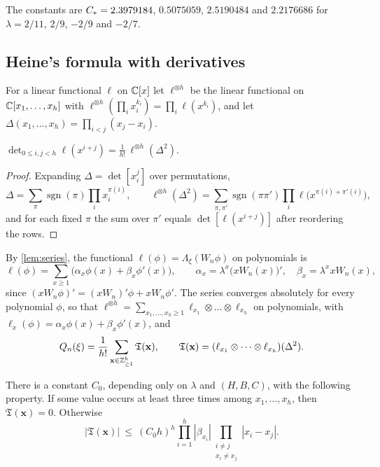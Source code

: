The constants are $C_{*}=2.3979184$, $0.5075059$, $2.5190484$ and $2.2176686$ for $\lambda=2/11$, $2/9$, $-2/9$ and $-2/7$.

\subsection{Heine's formula with derivatives}\label{sec:heine}
For a linear functional $\ell$ on $\mathbb{C}[x]$ let $\ell^{\otimes h}$ be the linear functional on $\mathbb{C}[x_1,\dots,x_h]$ with $\ell^{\otimes h}(\prod_ix_i^{k_i})=\prod_i\ell(x^{k_i})$, and let $\Delta(x_1,\dots,x_h)=\prod_{i<j}(x_j-x_i)$.

\begin{lemma}[Heine]\label{lem:heine}
$\det_{0\le i,j<h}\ell(x^{i+j})=\frac1{h!}\,\ell^{\otimes h}(\Delta^2)$.
\end{lemma}

\begin{proof}
Expanding $\Delta=\det[x_i^{j}]$ over permutations,
\[
\Delta=\sum_\pi\operatorname{sgn}(\pi)\prod_ix_i^{\pi(i)},\qquad \ell^{\otimes h}(\Delta^2)=\sum_{\pi,\pi'}\operatorname{sgn}(\pi\pi')\prod_i\ell\bigl(x^{\pi(i)+\pi'(i)}\bigr),
\]
and for each fixed $\pi$ the sum over $\pi'$ equals $\det[\ell(x^{i+j})]$ after reordering the rows.
\end{proof}

By \cref{lem:series}, the functional $\ell(\phi)=\Lambda_\xi(W_n\phi)$ on polynomials is
\[
\ell(\phi)=\sum_{x\ge1}\bigl(\alpha_x\phi(x)+\beta_x\phi'(x)\bigr),\qquad \alpha_x=\lambda^x\bigl(xW_n(x)\bigr)',\quad \beta_x=\lambda^xxW_n(x),
\]
since $(xW_n\phi)'=(xW_n)'\phi+xW_n\phi'$. The series converges absolutely for every polynomial $\phi$, so that $\ell^{\otimes h}=\sum_{x_1,\dots,x_h\ge1}\ell_{x_1}\otimes\dots\otimes\ell_{x_h}$ on polynomials, with $\ell_x(\phi)=\alpha_x\phi(x)+\beta_x\phi'(x)$, and
\begin{equation}\label{eq:heine-sum}
Q_n(\xi)=\frac1{h!}\sum_{\mathbf x\in\mathbb{Z}_{\ge1}^h}\mathfrak T(\mathbf x),\qquad \mathfrak T(\mathbf x)=(\ell_{x_1}\otimes\dots\otimes\ell_{x_h})(\Delta^2).
\end{equation}

\begin{lemma}[multiplicity]\label{lem:multiplicity}
There is a constant $C_0$, depending only on $\lambda$ and $(H,B,C)$, with the following property. If some value occurs at least three times among $x_1,\dots,x_h$, then $\mathfrak T(\mathbf x)=0$. Otherwise
\[
|\mathfrak T(\mathbf x)|\ \le\ (C_0h)^h\prod_{i=1}^h|\beta_{x_i}|\prod_{\substack{i\ne j\\ x_i\ne x_j}}|x_i-x_j| .
\]
\end{lemma}


